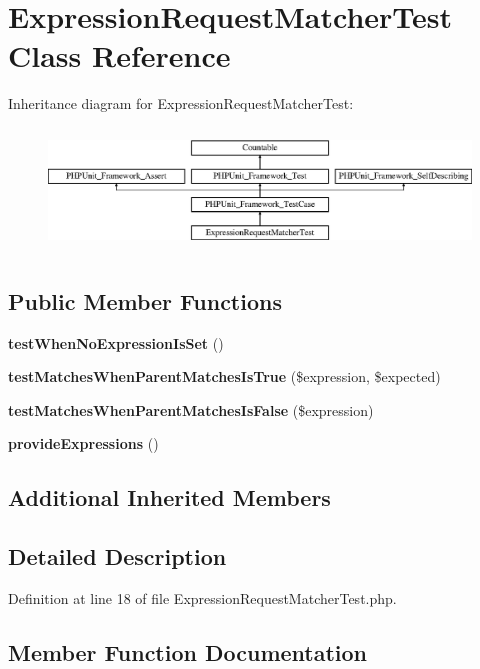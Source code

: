 \section{Expression\+Request\+Matcher\+Test Class Reference}
\label{class_symfony_1_1_component_1_1_http_foundation_1_1_tests_1_1_expression_request_matcher_test}
Inheritance diagram for Expression\+Request\+Matcher\+Test\+:\begin{figure}[H]
\begin{center}
\leavevmode
\includegraphics[height=3.303835cm]{class_symfony_1_1_component_1_1_http_foundation_1_1_tests_1_1_expression_request_matcher_test}
\end{center}
\end{figure}
\subsection*{Public Member Functions}
\begin{DoxyCompactItemize}
\item 
{\bf test\+When\+No\+Expression\+Is\+Set} ()
\item 
{\bf test\+Matches\+When\+Parent\+Matches\+Is\+True} (\$expression, \$expected)
\item 
{\bf test\+Matches\+When\+Parent\+Matches\+Is\+False} (\$expression)
\item 
{\bf provide\+Expressions} ()
\end{DoxyCompactItemize}
\subsection*{Additional Inherited Members}


\subsection{Detailed Description}


Definition at line 18 of file Expression\+Request\+Matcher\+Test.\+php.



\subsection{Member Function Documentation}
